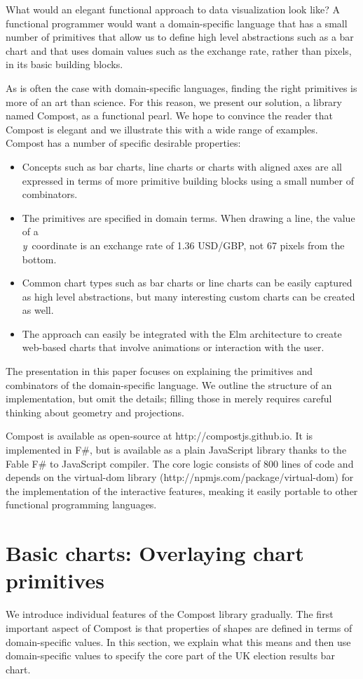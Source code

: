 \documentclass{jfp}
\newcommand{\Y}{\emph{y}\ }
\newcommand{\urrl}[1]{\textnormal{\textcolor{urlclr}{#1}}}
\begin{document}
What would an elegant functional approach to data visualization look like? A functional programmer
would want a domain-specific language that has a small number of primitives that allow us to define
high level abstractions such as a bar chart and that uses domain values such as the exchange
rate, rather than pixels, in its basic building blocks.

As is often the case with domain-specific languages, finding the right primitives is more of an art
than science. For this reason, we present our solution, a library named Compost, as a functional pearl.
We hope to convince the reader that Compost is elegant and we illustrate this with a wide range
of examples. Compost has a number of specific desirable properties:

\begin{itemize}
\item Concepts such as bar charts, line charts or charts with aligned
  axes are all expressed in terms of more primitive building blocks using a small number of combinators.
\item The primitives are specified in domain terms. When drawing a line, the value of a \\ \Y coordinate
  is an exchange rate of 1.36 USD/GBP, not 67 pixels from the bottom.
\item Common chart types such as bar charts or line charts can be easily captured as high level
  abstractions, but many interesting custom charts can be created as well.
\item The approach can easily be integrated with the Elm architecture \cite{elm}
	to create web-based charts that involve animations or interaction with the user.
\end{itemize}
%
The presentation in this paper focuses on explaining the primitives and combinators of the
domain-specific language. We outline the structure of an implementation, but omit the details; filling
those in merely requires careful thinking about geometry and projections.

Compost is available as open-source at \urrl{http://compostjs.github.io}. It is implemented in F\#,
but is available as a plain JavaScript library thanks to the Fable F\# to JavaScript compiler.
The core logic consists of 800 lines of code and depends on the virtual-dom
library (\urrl{http://npmjs.com/package/virtual-dom}) for the
implementation of the interactive features, meaking it easily portable to other functional
programming languages.

\section{Basic charts: Overlaying chart primitives}
We introduce individual features of the Compost library gradually. The first important aspect of
Compost is that properties of shapes are defined in terms of domain-specific values. In this
section, we explain what this means and then use domain-specific values to specify the core part of the
UK election results bar chart.
\end{document}
